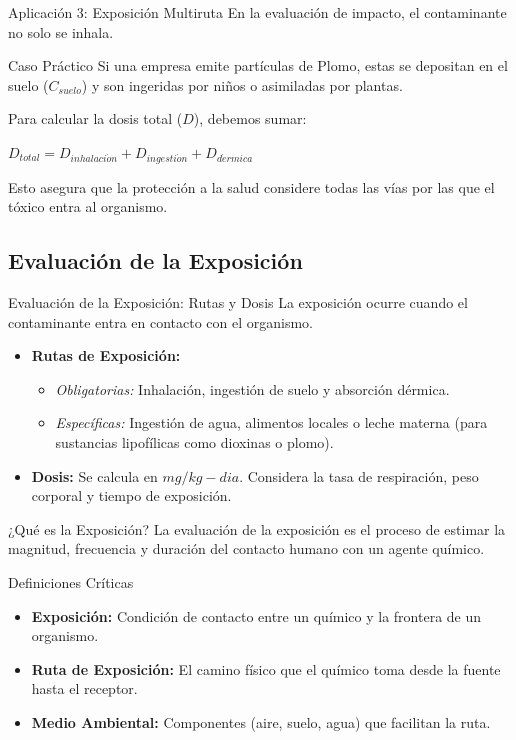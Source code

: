 \documentclass[10pt,compress]{beamer}
\begin{document}
\begin{frame}{Aplicación 3: Exposición Multiruta}
    En la evaluación de impacto, el contaminante no solo se inhala.
    \begin{exampleblock}{Caso Práctico}
        Si una empresa emite partículas de Plomo, estas se depositan en el suelo ($C_{suelo}$) y son ingeridas por niños o asimiladas por plantas. 
    \end{exampleblock}
    Para calcular la dosis total ($D$), debemos sumar:
    \begin{center}
        $D_{total} = D_{inhalaci\acute{o}n} + D_{ingesti\acute{o}n} + D_{d\acute{e}rmica}$ 
    \end{center}
    Esto asegura que la protección a la salud considere todas las vías por las que el tóxico entra al organismo.
\end{frame}

\subsection{Evaluación de la Exposición}
\begin{frame}{Evaluación de la Exposición: Rutas y Dosis}
    La exposición ocurre cuando el contaminante entra en contacto con el organismo.
    \begin{itemize}
        \item \textbf{Rutas de Exposición:}
        \begin{itemize}
            \item \textit{Obligatorias:} Inhalación, ingestión de suelo y absorción dérmica.
            \item \textit{Específicas:} Ingestión de agua, alimentos locales o leche materna (para sustancias lipofílicas como dioxinas o plomo).
        \end{itemize}
        \item \textbf{Dosis:} Se calcula en $mg/kg-dia$. Considera la tasa de respiración, peso corporal y tiempo de exposición.
    \end{itemize}
\end{frame}

\begin{frame}{¿Qué es la Exposición?}
    La evaluación de la exposición es el proceso de estimar la magnitud, frecuencia y duración del contacto humano con un agente químico.
    \begin{block}{Definiciones Críticas}
        \begin{itemize}
            \item \textbf{Exposición:} Condición de contacto entre un químico y la frontera de un organismo.
            \item \textbf{Ruta de Exposición:} El camino físico que el químico toma desde la fuente hasta el receptor.
            \item \textbf{Medio Ambiental:} Componentes (aire, suelo, agua) que facilitan la ruta.
        \end{itemize}
    \end{block}
\end{frame}
\end{document}
